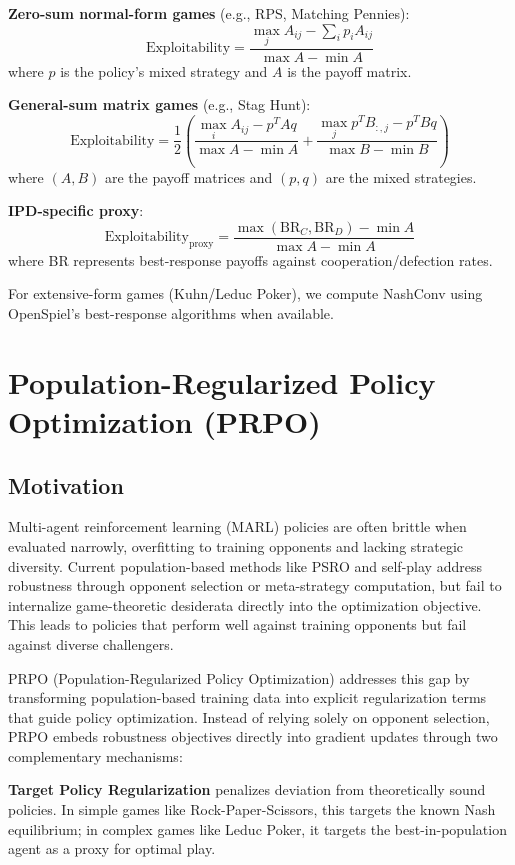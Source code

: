 \documentclass[sigconf,anonymous]{aamas}
\begin{document}
\textbf{Zero-sum normal-form games} (e.g., RPS, Matching Pennies):
\[
\text{Exploitability} = \frac{\max_{j} A_{ij} - \sum_i p_i A_{ij}}{\max A - \min A}
\]
where $p$ is the policy's mixed strategy and $A$ is the payoff matrix.

\textbf{General-sum matrix games} (e.g., Stag Hunt):
\[
\text{Exploitability} = \frac{1}{2} \left( \frac{\max_i A_{ij} - p^T A q}{\max A - \min A} + \frac{\max_j p^T B_{:,j} - p^T B q}{\max B - \min B} \right)
\]
where $(A,B)$ are the payoff matrices and $(p,q)$ are the mixed strategies.

\textbf{IPD-specific proxy}:
\[
\text{Exploitability}_\text{proxy} = \frac{\max(\text{BR}_C, \text{BR}_D) - \min A}{\max A - \min A}
\]
where BR represents best-response payoffs against cooperation/defection rates.

For extensive-form games (Kuhn/Leduc Poker), we compute NashConv using OpenSpiel's best-response algorithms when available.



\section{Population-Regularized Policy Optimization (PRPO)}
\label{sec:prpo}

\subsection{Motivation}

Multi-agent reinforcement learning (MARL) policies are often brittle when evaluated narrowly, overfitting to training opponents and lacking strategic diversity. Current population-based methods like PSRO and self-play address robustness through opponent selection or meta-strategy computation, but fail to internalize game-theoretic desiderata directly into the optimization objective. This leads to policies that perform well against training opponents but fail against diverse challengers.

PRPO (Population-Regularized Policy Optimization) addresses this gap by transforming population-based training data into explicit regularization terms that guide policy optimization. Instead of relying solely on opponent selection, PRPO embeds robustness objectives directly into gradient updates through two complementary mechanisms:

\textbf{Target Policy Regularization} penalizes deviation from theoretically sound policies. In simple games like Rock-Paper-Scissors, this targets the known Nash equilibrium; in complex games like Leduc Poker, it targets the best-in-population agent as a proxy for optimal play.
\end{document}
